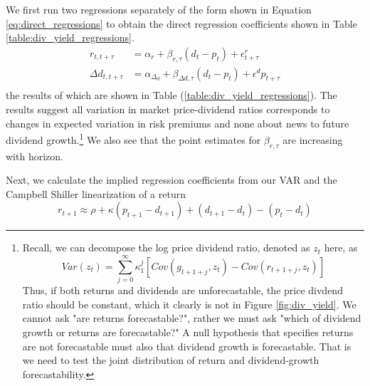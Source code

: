 \documentclass[11pt,letter]{article}
\begin{document}
We first run two regressions separately of the form shown in Equation \ref{eq:direct_regressions} to obtain the direct regression coefficients shown in Table \ref{table:div_yield_regressions}. 
\begin{equation}
	\begin{split}
	r_{t, t+\tau} & = \alpha_r + \beta_{r, \tau}(d_t - p_t) + \epsilon^r_{t+\tau}\\
	\Delta d_{t, t+\tau} & = \alpha_{\Delta_d}+\beta_{\Delta d, \tau}(d_t - p_t)+ \epsilon^dp_{t+\tau}\\
	\end{split}
	\label{eq:direct_regressions}
\end{equation}
the results of which are shown in Table (\ref{table:div_yield_regressions}). The results suggest all variation in market price-dividend ratios corresponds to changes in expected variation in risk premiums and none about news to future dividend growth.\footnote{ Recall, we can decompose the log price dividend ratio, denoted as $z_t$ here, as
\begin{equation*}
	Var(z_t) = \sum_{j=0}^{\infty}\kappa^j_1\left[Cov(g_{t+1+j}, z_t)- Cov(r_{t+1+j}, z_t)\right]
\end{equation*}
Thus, if both returns and dividends are unforecastable, the price divdend ratio should be constant, which it clearly is not in Figure \ref{fig:div_yield}. We cannot ask "are returns forecastable?", rather we must ask "which of dividend growth or returns are forecastable?" A null hypothesis that specifies returns are not forecastable must also that dividend growth is forecastable. That is we need to test the joint distribution of return and dividend-growth forecastability. } We also see that the point estimates for $\beta_{r, \tau}$ are increasing with horizon. 




Next, we calculate the implied regression coefficients from our VAR and the Campbell Shiller linearization of a return
\begin{equation*}
	r_{t+1} \approx \rho + \kappa(p_{t+1} - d_{t+1}) + (d_{t+1}-d_t) - (p_t - d_t)
\end{equation*}
\end{document}
